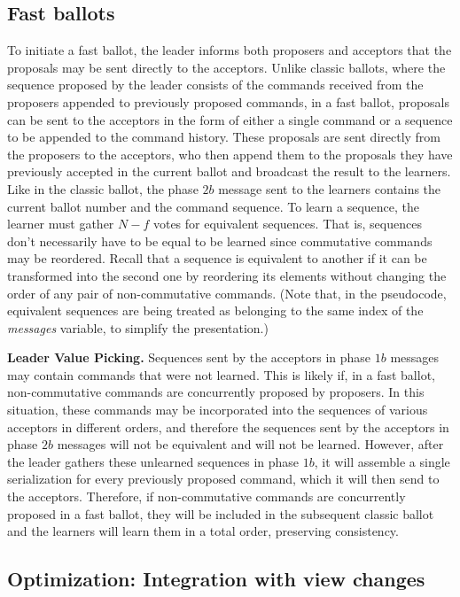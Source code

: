 \subsection{Fast ballots} 
To initiate a fast ballot, the leader informs both proposers and acceptors that the proposals may be sent directly to the acceptors. Unlike classic ballots, where the sequence proposed by the leader consists of the commands received from the proposers appended to previously proposed commands, in a fast ballot, proposals can be sent to the acceptors in the form of either a single command or a sequence to be appended to the command history. These proposals are sent directly from the proposers to the acceptors, who then append them to the proposals they have previously accepted in the current ballot and broadcast the result to the learners. Like in the classic ballot, the phase $2b$ message sent to the learners contains the current ballot number and the command sequence. To learn a sequence, the learner must gather $N-f$ votes for equivalent sequences. That is, sequences don't necessarily have to be equal to be learned since commutative commands may be reordered. Recall that a sequence is equivalent to another if it can be transformed into the second one by reordering its elements without changing the order of any pair of non-commutative commands. (Note that, in the pseudocode, equivalent sequences are being treated as belonging to the same index of the \emph{messages} variable, to simplify the presentation.) \par
\textbf{Leader Value Picking.} Sequences sent by the acceptors in phase $1b$ messages may contain commands that were not learned. This is likely if, in a fast ballot, non-commutative commands are  concurrently proposed by proposers. In this situation, these commands may be incorporated into the sequences of various acceptors in different orders, and therefore the sequences sent by the acceptors in phase $2b$ messages will not be equivalent and will not be learned. However, after the leader gathers these unlearned sequences in phase $1b$, it will assemble a single serialization for every previously proposed command, which it will then send to the acceptors. Therefore, if non-commutative commands are concurrently proposed in a fast ballot, they will be included in the subsequent classic ballot and the learners will learn them in a total order, preserving consistency.

\iffalse 
\subsection{Optimization: Integration with view changes}

